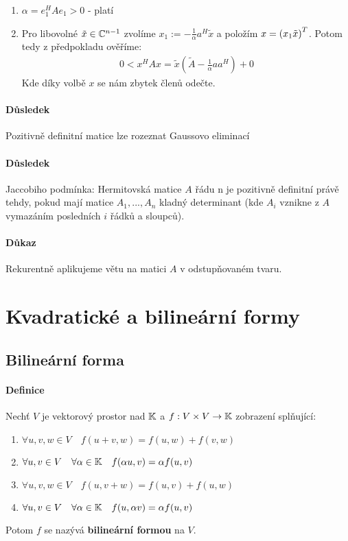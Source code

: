 \documentclass[a4paper,10pt]{article}
\begin{document}
\begin{description}
\begin{enumerate}
	\item $\alpha = e_1^H A e_1 > 0$ - platí
	\item Pro libovolné $\tilde{x} \in \mathbb{C}^{n-1}$ zvolíme $x_1 := -
	\frac{1}{\alpha}a^H \tilde{x}$ a položím $x = \left( x_1 \\ \tilde{x}
	\right)^T$. Potom tedy z předpokladu ověříme:
	\begin{align}
		0 < x^H A x = \tilde{x}\left( \tilde{A} - \frac{1}{\alpha} a a^H \right)
		+ 0
	\end{align}
	Kde díky volbě $x$  se nám zbytek členů odečte.
\end{enumerate}
\end{description}
\paragraph{Důsledek}
Pozitivně definitní matice lze rozeznat Gaussovo eliminací
\paragraph{Důsledek}
Jaccobiho podmínka: Hermitovská matice $A$ řádu n je pozitivně definitní právě
tehdy, pokud mají matice $A_1, ..., A_n$ kladný determinant (kde $A_i$ vznikne z
$A$ vymazáním posledních $i$ řádků a sloupců).
\paragraph{Důkaz}
Rekurentně aplikujeme větu na matici $A$ v odstupňovaném tvaru.


\section{Kvadratické a bilineární formy}
\setcounter{equation}{0}
\subsection{Bilineární forma}
\setcounter{equation}{0}
\paragraph{Definice}
Nechť $V$ je vektorový prostor nad $\mathbb{K}$ a $f: V \times V \to \mathbb{K}$ zobrazení splňující:
\begin{enumerate}
	\item $\forall u,v,w \in V \quad f(u+v, w) = f(u, w) + f(v,w)$
	\item $\forall u,v \in V \quad \forall \alpha \in \mathbb{K} \quad f(\alpha u, v) =
	\alpha f(u,v)$
	\item $\forall u,v,w \in V \quad f(u,v+ w) = f(u, v) + f(u,w)$
	\item $\forall u,v \in V \quad \forall \alpha \in \mathbb{K} \quad f(u, \alpha v) =
	\alpha f(u,v)$
\end{enumerate}
Potom $f$ se nazývá \textbf{bilineární formou} na $V$.
\end{document}
